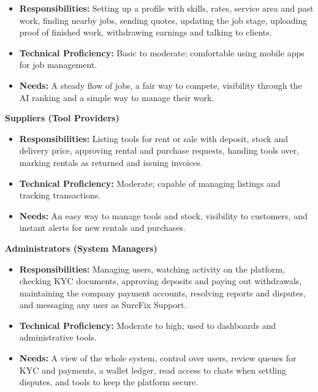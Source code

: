\documentclass[A4paper,12pt]{report}
\theoremstyle{plain}
\theoremstyle{definition}
\theoremstyle{remark}
\numberwithin{equation}{section}
\begin{document}
    \begin{itemize}
                \item \textbf{Responsibilities:} Setting up a profile with skills, rates, service area and past work, finding nearby jobs, sending quotes, updating the job stage, uploading proof of finished work, withdrawing earnings and talking to clients.
        \item \textbf{Technical Proficiency:} Basic to moderate; comfortable using mobile apps for job management.
        \item \textbf{ Needs:} A steady flow of jobs, a fair way to compete, visibility through the AI ranking and a simple way to manage their work.
        
    \end{itemize}
\textbf{Suppliers (Tool Providers)}

    \begin{itemize}
                \item \textbf{Responsibilities:} Listing tools for rent or sale with deposit, stock and delivery price, approving rental and purchase requests, handing tools over, marking rentals as returned and issuing invoices.
        \item \textbf{Technical Proficiency:} Moderate; capable of managing listings and tracking transactions.
        \item \textbf{ Needs:} An easy way to manage tools and stock, visibility to customers, and instant alerts for new rentals and purchases.
        
    \end{itemize}

\textbf{Administrators (System Managers)}

    \begin{itemize}
                \item \textbf{Responsibilities:} Managing users, watching activity on the platform, checking KYC documents, approving deposits and paying out withdrawals, maintaining the company payment accounts, resolving reports and disputes, and messaging any user as SureFix Support.
        \item \textbf{Technical Proficiency:} Moderate to high; used to dashboards and administrative tools.
                \item \textbf{ Needs:} A view of the whole system, control over users, review queues for KYC and payments, a wallet ledger, read access to chats when settling disputes, and tools to keep the platform secure.
        
    \end{itemize}
\end{document}
